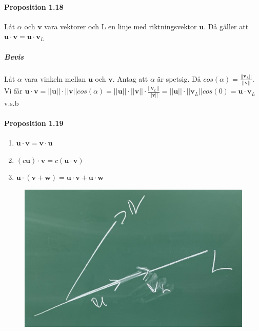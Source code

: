 \paragraph{Proposition 1.18} Låt $\alpha$ och $\bm{v}$ vara vektorer och L en linje med riktningsvektor $\bm{u}$.
Då gäller att $\bm{u}\cdot \bm{v} = \bm{u} \cdot \bm{v}_{L}$
\subparagraph{Bevis} Låt $\alpha$ vara vinkeln mellan $\bm{u}$ och $\bm{v}$.
Antag att $\alpha$ är spetsig. Då $cos(\alpha)=\frac{||\bm{v}_{L}||}{||\bm{v}||}$.\\
Vi får $\bm{u}\cdot \bm{v}=||\bm{u}||\cdot ||\bm{v}||cos(\alpha) = ||\bm{u}||\cdot ||\bm{v}||\cdot \frac{||\bm{v}_{L}||}{||\bm{v}||}=||\bm{u}||\cdot ||\bm{v}_{L}||cos(0)=\bm{u}\cdot\bm{v}_{L}$ v.s.b

\paragraph{Proposition 1.19}
\begin{enumerate}
    \item $\bm{u}\cdot \bm{v}=\bm{v}\cdot \bm{u}$
    \item $(c\bm{u})\cdot \bm{v} = c(\bm{u}\cdot \bm{v})$
    \item $\bm{u}\cdot (\bm{v} + \bm{w}) = \bm{u}\cdot \bm{v} + \bm{u} \cdot \bm{w}$
\end{enumerate}


\begin{figure}
    \vspace{-40pt}
    \centering
    \includegraphics[scale=0.06]{imgs/22-01-20-img05.jpg}
    \vspace{-30pt}
\end{figure}
